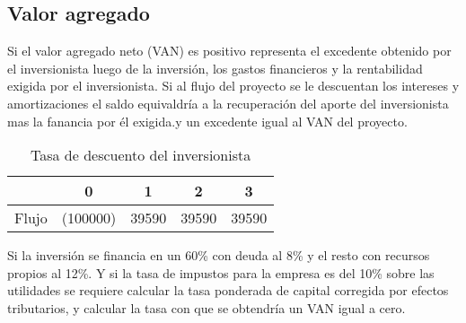 \documentclass[a4paper, 11pt, oneside]{article}
\begin{document}
\subsection{Valor agregado}
Si el valor agregado neto (VAN) es positivo representa el excedente obtenido por el inversionista luego de la inversión, los gastos financieros y la rentabilidad exigida por el inversionista.
Si al flujo del proyecto se le descuentan los intereses y amortizaciones el saldo equivaldría a la recuperación del aporte del inversionista mas la fanancia por él exigida.y un excedente igual al VAN del proyecto.
\begin{table}
 \begin{tabular}{|c|c|c|c|c|}
  \hline
   & 0 & 1 & 2 & 3 \\
  \hline
  Flujo & (100000) & 39590 & 39590 & 39590 \\
  \hline
 \end{tabular}
  \caption{Tasa de descuento del inversionista}
\end{table}

Si la inversión se financia en un 60\% con deuda al 8\% y el resto con recursos propios al 12\%. Y si la tasa de impustos para la empresa es del 10\% sobre las utilidades se requiere calcular la tasa ponderada de capital corregida por efectos tributarios, y calcular la tasa con que se obtendría un VAN igual a cero.
\end{document}
